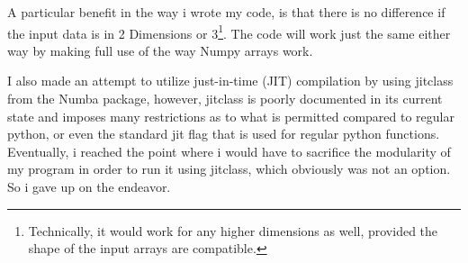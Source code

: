 \documentclass[10pt,showpacs,preprintnumbers,amsmath,amssymb,nofootinbib,aps,prl,twocolumn,groupedaddress,superscriptaddress,showkeys]{revtex4-1}
\begin{document}
    A particular benefit in the way i wrote my code, is that there is no difference if the input data is in 2 Dimensions or 3\footnote{Technically, it would work for any higher dimensions as well, provided the shape of the input arrays are compatible.}. The code will work just the same either way by making full use of the way Numpy arrays work.

    I also made an attempt to utilize just-in-time (JIT) compilation by using jitclass from the Numba package, however, jitclass is poorly documented in its current state and imposes many restrictions as to what is permitted compared to regular python, or even the standard jit flag that is used for regular python functions. Eventually, i reached the point where i would have to sacrifice the modularity of my program in order to run it using jitclass, which obviously was not an option. So i gave up on the endeavor.
\end{document}
